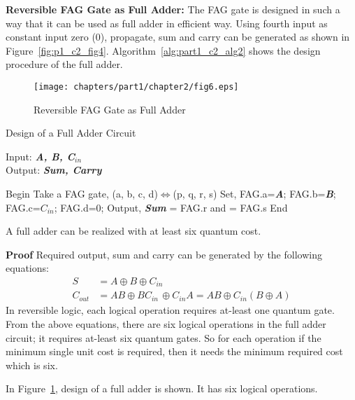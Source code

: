 \noindent\textbf{Reversible FAG Gate as Full Adder:} The FAG gate is designed in such a way that it can be used as full adder in efficient way. Using fourth input as constant input zero (0), propagate, sum and carry can be generated as shown in Figure~\ref{fig:p1_c2_fig4}. Algorithm~\ref{alg:part1_c2_alg2} shows the design procedure of the full adder.
\begin{figure}[!tbh]
\centering
\texttt{[image: chapters/part1/chapter2/fig6.eps]}
\caption{Reversible FAG Gate as Full Adder}
\label{fig:p1_c2_fig6}
\end{figure}
\begin{algorithm}[H]
\caption{Design of a Full Adder Circuit}
Input: {\bf {\it A, B, C${}_{in}$}}\\
Output: {\bf {\it Sum, Carry}}
\label{alg:part1_c2_alg2}

\begin{algorithmic}[1]

\STATE Begin
\STATE Take a FAG gate, (a, b, c, d)$\Leftrightarrow$(p, q, r, s)
\STATE Set, FAG.a={\bf {\it A}}; FAG.b={\bf {\it B}}; \STATE FAG.c={\bf {\it $C_{in}$}}; FAG.d=0;
\STATE Output, {\bf {\it Sum}} = FAG.r and
 = FAG.s{\bf }
\STATE End
\end{algorithmic}
\end{algorithm}
\begin{property}\textnormal{
A full adder can be realized with at least six quantum cost.}
\end{property}

\noindent\textbf{Proof} Required output, sum and carry can be generated by the following equations:
\begin{align*}
S &= A \oplus B \oplus C{}_{in}\\
C{}_{out} &= AB \oplus BC{}_{in\ }\oplus C{}_{in}A = AB \oplus C{}_{in}(B\oplus A)
\end{align*}\textnormal{
In reversible logic, each logical operation requires at-least one quantum gate. From the above equations, there are six logical operations in the full adder circuit; it requires at-least six quantum gates. So for each operation if the minimum single unit cost is required, then it needs the minimum required cost which is six.}

\begin{example}\textnormal{
In Figure~\ref{fig:p1_c2_fig6}, design of a full adder is shown. It has six logical operations.}%
\end{example}
